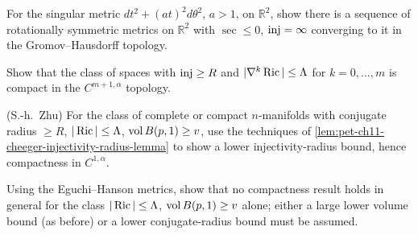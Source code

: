 \begin{remark}[Exercise 11.6.11]
  \label{rem:pet-ch11-exercise-11-6-11}
  For the singular metric $dt^2+(at)^2d\theta^2$, $a>1$, on $\mathbb{R}^2$, show
  there is a sequence of rotationally symmetric metrics on $\mathbb{R}^2$ with
  $\sec\le0$, $\operatorname{inj}=\infty$ converging to it in the Gromov--Hausdorff
  topology.
\end{remark}

\begin{remark}[Exercise 11.6.12]
  \label{rem:pet-ch11-exercise-11-6-12}
  Show that the class of spaces with $\operatorname{inj}\ge R$ and
  $|\nabla^k\operatorname{Ric}|\le\Lambda$ for $k=0,\dots,m$ is compact in the
  $C^{m+1,\alpha}$ topology.
\end{remark}

\begin{remark}[Exercise 11.6.13]
  \label{rem:pet-ch11-exercise-11-6-13}
  (S.-h.\ Zhu) For the class of complete or compact $n$-manifolds with
  conjugate radius $\ge R$, $|\operatorname{Ric}|\le\Lambda$, $\operatorname{vol} B(p,1)\ge v$, use the
  techniques of \cref{lem:pet-ch11-cheeger-injectivity-radius-lemma} to show
  a lower injectivity-radius bound, hence compactness in $C^{1,\alpha}$.
\end{remark}

\begin{remark}[Exercise 11.6.14]
  \label{rem:pet-ch11-exercise-11-6-14}
  Using the Eguchi--Hanson metrics, show that no compactness result holds in
  general for the class $|\operatorname{Ric}|\le\Lambda$, $\operatorname{vol} B(p,1)\ge v$ alone; either a
  large lower volume bound (as before) or a lower conjugate-radius bound must
  be assumed.
\end{remark}

